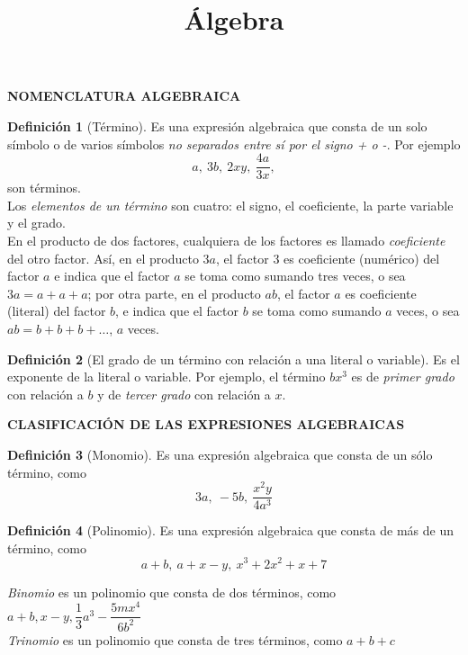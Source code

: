 \documentclass[12pt,letterpaper]{article}
\title{Álgebra}
\theoremstyle{definition}
\newtheorem{defn}{Definición}
\begin{document}

\textbf{NOMENCLATURA ALGEBRAICA} %

\begin{defn}[Término]
Es una expresión algebraica que consta de un solo símbolo o de varios símbolos \emph{no separados entre sí por el signo + o -}. Por ejemplo
\begin{equation*}
a, \ 3b, \ 2xy, \ \dfrac{4a}{3x},
\end{equation*}
son términos.\\
Los \emph{elementos de un término} son cuatro: el signo, el coeficiente, la parte variable y el grado.\\
En el producto de dos factores, cualquiera de los factores es llamado \emph{coeficiente} del otro factor. Así, en el producto $3a$, el factor 3 es coeficiente (numérico) del factor $a$ e indica que el factor $a$ se toma como sumando tres veces, o sea $3a=a+a+a$; por otra parte, en el producto $ab$, el factor $a$ es coeficiente (literal) del factor $b$, e indica que el factor $b$ se toma como sumando $a$ veces, o sea $ab=b+b+b+\dots$, $a$ veces.
\end{defn}

\begin{defn}[El grado de un término con relación a una literal o variable]
Es el exponente de la literal o variable. Por ejemplo, el término $bx^3$ es de \emph{primer grado} con relación a $b$ y de \emph{tercer grado} con relación a $x$.
\end{defn}

\smallskip

\textbf{CLASIFICACIÓN DE LAS EXPRESIONES ALGEBRAICAS}%

\begin{defn}[Monomio]
Es una expresión algebraica que consta de un sólo término, como 
\begin{equation*}
3a, \ -5b, \ \dfrac{x^2y}{4a^3}
\end{equation*}
\end{defn}

\begin{defn}[Polinomio]
Es una expresión algebraica que consta de más de un término, como \begin{equation*}
a+b, \ a+x-y, \ x^3+2x^2+x+7
\end{equation*}

\emph{Binomio} es un polinomio que consta de dos términos, como $a+b,x-y, \dfrac{1}{3}a^3-\dfrac{5mx^4}{6b^2}$\\
\emph{Trinomio} es un polinomio que consta de tres términos, como $a+b+c$
\end{defn}
\end{document}
